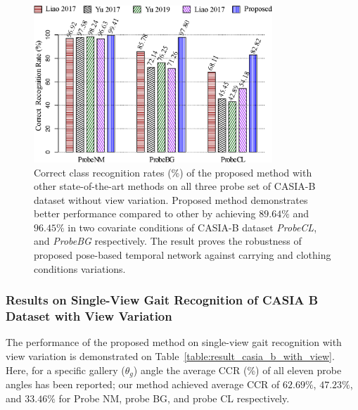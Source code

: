 \begin{figure}
	\centering
	\includegraphics[width = 0.8\textwidth]{figures/comp_casia_b_without_view.eps}
	\caption [Correct class recognition rates (\%) of the proposed method with other state-of-the-art methods on all three probe set of CASIA-B dataset without view variation] 
	{Correct class recognition rates (\%) of the proposed method with other state-of-the-art methods on all three probe set of CASIA-B dataset without view variation. Proposed method demonstrates better performance compared to other by achieving $89.64\%$ and $96.45\%$ in two covariate conditions of CASIA-B dataset \textit{ProbeCL}, and \textit{ProbeBG} respectively. The result proves the robustness of proposed pose-based temporal network against carrying and clothing conditions variations.  \label{fig:comp_casia_b_without_view}
	}
\end{figure}


\subsubsection{Results on Single-View Gait Recognition of CASIA B Dataset with View Variation}
The performance of the proposed method on single-view gait recognition with view variation is demonstrated on Table~\ref{table:result_casia_b_with_view}. Here, for a specific gallery ($ \theta_g $) angle the average CCR (\%) of all eleven probe angles has been reported; our method achieved average CCR of $62.69\%$, $47.23\%$, and $33.46\%$ for Probe NM, probe BG, and probe CL respectively.


